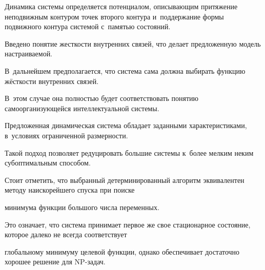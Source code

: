Динамика системы определяется потенциалом, описывающим притяжение неподвижным контуром точек второго контура и~поддержание формы подвижного контура системой с~памятью состояний.

Введено понятие жесткости внутренних связей, что делает предложенную модель настраиваемой.

В~дальнейшем предполагается, что система сама должна выбирать функцию жёсткости внутренних связей.

В~этом случае она полностью будет соответствовать понятию самоорганизующейся интеллектуальной системы.



Предложенная динамическая система обладает заданными характеристиками, в~условиях ограниченной размерности.

Такой подход позволяет редуцировать большие системы к~более мелким неким субоптимальным способом.



Стоит отметить, что выбранный детерминированный алгоритм эквивалентен методу наискорейшего спуска при поиске

минимума функции большого числа переменных.

Это означает, что система принимает первое же свое стационарное состояние, которое далеко не всегда соответствует

глобальному минимуму целевой функции, однако обеспечивает достаточно хорошее решение для NP-задач.





\pagebreak



